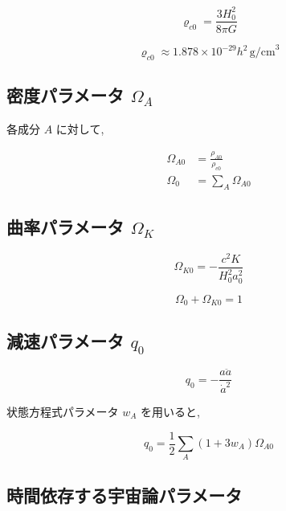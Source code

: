 \documentclass[a4paper,12pt]{article}
\begin{document}
  \begin{equation*}
    \varrho_{c0} = \frac{3 H_0^2}{8 \pi G}
  \end{equation*}
  
  \begin{equation*}
    \varrho_{c0} \approx 1.878 \times 10^{-29} h^2\, \text{g/cm}^3
  \end{equation*}
  
  \subsection*{密度パラメータ $\Omega_A$}
  
  各成分 $A$ に対して,
  
  \begin{align*}
    \Omega_{A0} &= \frac{\rho_{A0}}{\rho_{c0}} \\
    \Omega_0 &= \sum_A \Omega_{A0}
  \end{align*}
  
  \subsection*{曲率パラメータ $\Omega_K$}
  
  \begin{equation*}
    \Omega_{K0} = -\frac{c^2 K}{H_0^2 a_0^2}
  \end{equation*}
  
  \begin{equation*}
    \Omega_0 + \Omega_{K0} = 1
  \end{equation*}
  
  \subsection*{減速パラメータ $q_0$}
  
  \begin{equation*}
    q_0 = -\frac{a \ddot{a}}{\dot{a}^2}
  \end{equation*}
  
  状態方程式パラメータ $w_A$ を用いると,
  
  \begin{equation*}
    q_0 = \frac{1}{2} \sum_A (1 + 3w_A) \Omega_{A0}
  \end{equation*}
  
  \subsection*{時間依存する宇宙論パラメータ}
  
\end{document}
